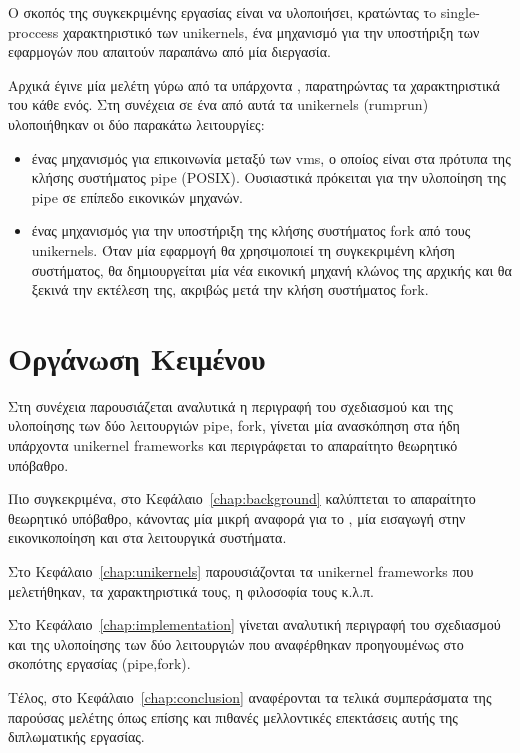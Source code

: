 Ο σκοπός της συγκεκριμένης εργασίας είναι να υλοποιήσει, κρατώντας τo
single-proccess χαρακτηριστικό των unikernels, ένα μηχανισμό για την υποστήριξη
των εφαρμογών που απαιτούν παραπάνω από μία διεργασία. 

Αρχικά έγινε μία μελέτη γύρω από τα υπάρχοντα , παρατηρώντας
τα χαρακτηριστικά του κάθε ενός. Στη συνέχεια σε ένα από αυτά τα unikernels
(rumprun) υλοποιήθηκαν οι δύο παρακάτω λειτουργίες:

\begin{itemize}
\item ένας μηχανισμός για επικοινωνία μεταξύ των vms, ο οποίος είναι στα πρότυπα
της κλήσης συστήματος pipe (POSIX). Ουσιαστικά πρόκειται για την υλοποίηση της
pipe σε επίπεδο εικονικών μηχανών. 
\item  ένας μηχανισμός για την υποστήριξη της κλήσης συστήματος fork από τους
unikernels. Όταν μία εφαρμογή θα χρησιμοποιεί τη συγκεκριμένη κλήση συστήματος,
θα δημιουργείται μία νέα εικονική μηχανή κλώνος της αρχικής και θα ξεκινά την
εκτέλεση της, ακριβώς μετά την κλήση συστήματος fork.
\end{itemize}

\section{Οργάνωση Κειμένου}
Στη συνέχεια παρουσιάζεται αναλυτικά η περιγραφή του σχεδιασμού και της
υλοποίησης των δύο λειτουργιών pipe, fork, γίνεται μία ανασκόπηση στα ήδη
υπάρχοντα unikernel frameworks και περιγράφεται το απαραίτητο θεωρητικό υπόβαθρο.

Πιο συγκεκριμένα, στο Κεφάλαιο~\ref{chap:background} καλύπτεται το απαραίτητο
θεωρητικό υπόβαθρο, κάνοντας μία μικρή αναφορά για το , μία
εισαγωγή στην εικονικοποίηση και στα λειτουργικά συστήματα. 

Στο Κεφάλαιο~\ref{chap:unikernels} παρουσιάζονται τα unikernel frameworks που
μελετήθηκαν, τα χαρακτηριστικά τους, η φιλοσοφία τους κ.λ.π. 

Στο Κεφάλαιο~\ref{chap:implementation} γίνεται αναλυτική περιγραφή του
σχεδιασμού και της υλοποίησης των δύο λειτουργιών που αναφέρθηκαν προηγουμένως
στο σκοπότης εργασίας (pipe,fork). 

Τέλος, στο Κεφάλαιο~\ref{chap:conclusion} αναφέρονται τα τελικά συμπεράσματα
της παρούσας μελέτης όπως επίσης και πιθανές μελλοντικές επεκτάσεις αυτής της
διπλωματικής εργασίας. 
